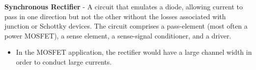 \vspace{0.5cm}
    \textbf{Synchronous Rectifier} - A circuit that emulates a diode, allowing current to pass in one direction but not the other without the losses associated with junction or Schottky devices. The circuit comprises a pass-element (most often a power MOSFET), a sense element, a sense-signal conditioner, and a driver.
    \begin{itemize}
        \setlength\itemsep{0.5em}
        \item{In the MOSFET application, the rectifier would have a large channel width in order to conduct large currents.}
    \end{itemize}
